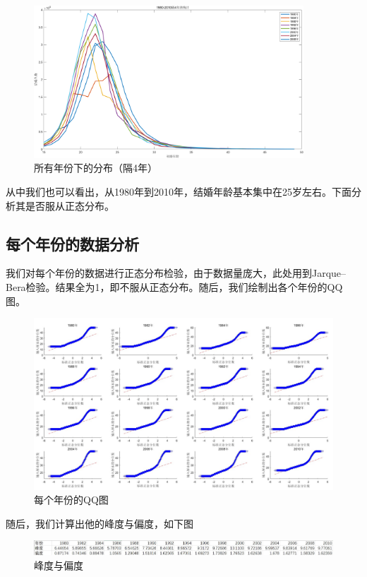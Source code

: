 \documentclass{ctexart}
\begin{document}
\begin{figure}[h!]
\centering
\includegraphics[width=0.9\textwidth]{003.png}
\caption{所有年份下的分布（隔4年）}
\end{figure}

从中我们也可以看出，从1980年到2010年，结婚年龄基本集中在25岁左右。下面分析其是否服从正态分布。




\subsection{每个年份的数据分析}
 \setlength{\parindent}{2em}我们对每个年份的数据进行正态分布检验，由于数据量庞大，此处用到Jarque–Bera检验。结果全为1，即不服从正态分布。随后，我们绘制出各个年份的QQ图。
 \begin{figure}[h!]
\centering
\includegraphics[width=1\textwidth]{004.JPG}
\caption{每个年份的QQ图}
\end{figure}
 
随后，我们计算出他的峰度与偏度，如下图

\begin{figure}[h!]
\centering
\includegraphics[width=1\textwidth]{005.JPG}
\caption{峰度与偏度}
\end{figure}
\end{document}
